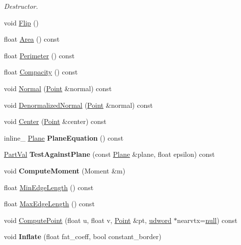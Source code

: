 \begin{DoxyCompactItemize}
\begin{DoxyCompactList}\small\item\em Destructor. \end{DoxyCompactList}\item 
void \hyperlink{classOpcode_1_1Triangle_a474ba7649c0a8fb7013892e7205911c9}{Flip} ()
\item 
float \hyperlink{classOpcode_1_1Triangle_ad3885c40e78c33327a622351dbb07ed7}{Area} () const 
\item 
float \hyperlink{classOpcode_1_1Triangle_a599d3355adcfa507458f8c59127162e7}{Perimeter} () const 
\item 
float \hyperlink{classOpcode_1_1Triangle_af797cac6e93b15df3ff798e66caaeca1}{Compacity} () const 
\item 
void \hyperlink{classOpcode_1_1Triangle_a5a58c9b3d52e65ba3c6bc45a01daa006}{Normal} (\hyperlink{classOpcode_1_1Point}{Point} \&normal) const 
\item 
void \hyperlink{classOpcode_1_1Triangle_ab3f35b42fe3eda2a5cb24ecb9352327a}{Denormalized\+Normal} (\hyperlink{classOpcode_1_1Point}{Point} \&normal) const 
\item 
void \hyperlink{classOpcode_1_1Triangle_ab12266ad0b45dfcdb90f73864324c610}{Center} (\hyperlink{classOpcode_1_1Point}{Point} \&center) const 
\item 
inline\+\_\+ \hyperlink{classOpcode_1_1Plane}{Plane} {\bfseries Plane\+Equation} () const \hypertarget{classOpcode_1_1Triangle_a2e5df9ce5b871687577dcdce0624d625}{}\label{classOpcode_1_1Triangle_a2e5df9ce5b871687577dcdce0624d625}

\item 
\hyperlink{Opcode_8h_a608a2f93617737a513782e86824d427d}{Part\+Val} {\bfseries Test\+Against\+Plane} (const \hyperlink{classOpcode_1_1Plane}{Plane} \&plane, float epsilon) const \hypertarget{classOpcode_1_1Triangle_a576c2439b17d2df127a309d455da88c2}{}\label{classOpcode_1_1Triangle_a576c2439b17d2df127a309d455da88c2}

\item 
void {\bfseries Compute\+Moment} (Moment \&m)\hypertarget{classOpcode_1_1Triangle_a399705e64e8a55eb29a6dcc042a5265f}{}\label{classOpcode_1_1Triangle_a399705e64e8a55eb29a6dcc042a5265f}

\item 
float \hyperlink{classOpcode_1_1Triangle_a013363d89cadfbaa44584c2d4514283a}{Min\+Edge\+Length} () const 
\item 
float \hyperlink{classOpcode_1_1Triangle_a7a67fed5c72f72dff4153d53cca3bf17}{Max\+Edge\+Length} () const 
\item 
void \hyperlink{classOpcode_1_1Triangle_ab7e8470714c153103ad1c1d72841e0cf}{Compute\+Point} (float u, float v, \hyperlink{classOpcode_1_1Point}{Point} \&pt, \hyperlink{IceTypes_8h_a44c6f1920ba5551225fb534f9d1a1733}{udword} $\ast$nearvtx=\hyperlink{IceTypes_8h_ac97b8ee753e4405397a42ad5799b0f9e}{null}) const 
\item 
void {\bfseries Inflate} (float fat\+\_\+coeff, bool constant\+\_\+border)\hypertarget{classOpcode_1_1Triangle_a707f856524937c61b1ada90faf19685c}{}\label{classOpcode_1_1Triangle_a707f856524937c61b1ada90faf19685c}

\end{DoxyCompactItemize}
